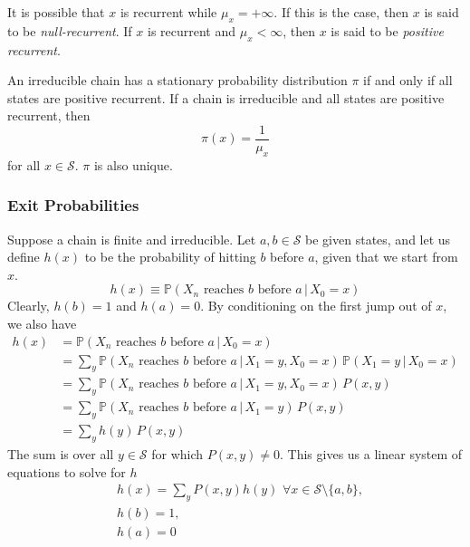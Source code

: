 \documentclass{article}
\begin{document}
    \begin{definition}
      It is possible that $x$ is recurrent while $\mu_x = +\infty$. If this is the case, then $x$ is said to be \textit{null-recurrent}. If $x$ is recurrent and $\mu_x < \infty$, then $x$ is said to be \textit{positive recurrent}. 
    \end{definition}

    \begin{theorem}
      An irreducible chain has a stationary probability distribution $\pi$ if and only if all states are positive recurrent. If a chain is irreducible and all states are positive recurrent, then 
      \begin{equation}
        \pi(x) = \frac{1}{\mu_x}
      \end{equation}
      for all $x \in \mathcal{S}$. $\pi$ is also unique. 
    \end{theorem}

    \subsubsection{Exit Probabilities}

      Suppose a chain is finite and irreducible. Let $a, b \in \mathcal{S}$ be given states, and let us define $h(x)$ to be the probability of hitting $b$ before $a$, given that we start from $x$. 
      \begin{equation}
        h(x) \equiv \mathbb{P} (X_n \text{ reaches } b \text{ before } a \, | \, X_0 = x)
      \end{equation}
      Clearly, $h(b) = 1$ and $h(a) = 0$. By conditioning on the first jump out of $x$, we also have 
      \begin{align*}
        h(x) & = \mathbb{P}(X_n \text{ reaches } b \text{ before } a \, | \, X_0 = x) \\
        & = \sum_{y} \mathbb{P}(X_n \text{ reaches } b \text{ before } a \, | \, X_1 = y, X_0 = x) \, \mathbb{P}(X_1 = y \,|\,X_0 = x) \\
        & = \sum_y \mathbb{P}(X_n \text{ reaches } b \text{ before } a \, | \,X_1 = y, X_0 = x) \, P(x, y) \\
        & = \sum_y \mathbb{P}(X_n \text{ reaches } b \text{ before } a \, | \,X_1 = y) \, P(x, y) \\
        & = \sum_y h(y) \, P(x, y) 
      \end{align*}
      The sum is over all $y \in \mathcal{S}$ for which $P(x, y) \neq 0$. This gives us a linear system of equations to solve for $h$
      \begin{align*}
        & h(x) = \sum_y P(x, y) h(y) \,\, \forall x \in \mathcal{S} \setminus \{a, b\}, \\
        & h(b) = 1, \\
        & h(a) = 0
      \end{align*}
\end{document}
